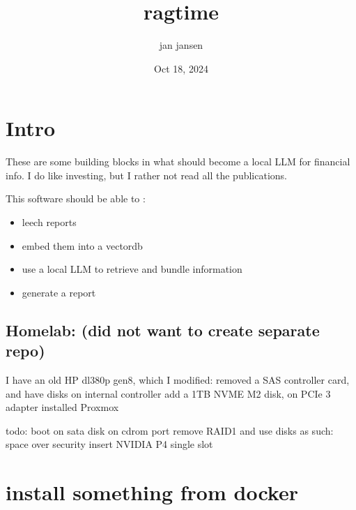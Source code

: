 \documentclass[letterpaper,10pt,english]{sphinxmanual}
\title{ragtime}
\date{Oct 18, 2024}
\author{jan jansen}
\begin{document}
\pagestyle{empty}
\sphinxmaketitle
\pagestyle{plain}
\sphinxtableofcontents
\pagestyle{normal}
\label{\detokenize{index::doc}}



\chapter{Intro}
\label{\detokenize{intro:intro}}\label{\detokenize{intro::doc}}
\sphinxAtStartPar
These are some building blocks in what should become a local LLM for financial info.
I do like investing, but I rather not read all the publications.

\sphinxAtStartPar
This software should be able to  :
\begin{itemize}
\item {} 
\sphinxAtStartPar
leech reports

\item {} 
\sphinxAtStartPar
embed them into a vectordb

\item {} 
\sphinxAtStartPar
use a local LLM to retrieve and bundle information

\item {} 
\sphinxAtStartPar
generate a report

\end{itemize}


\section{Homelab: (did not want to create separate repo)}
\label{\detokenize{intro:homelab-did-not-want-to-create-separate-repo}}
\sphinxAtStartPar
I have an old HP dl380p gen8, which I modified:
\sphinxhyphen{} removed a SAS controller card, and have disks on internal controller
\sphinxhyphen{} add a 1TB NVME M2 disk, on PCI\sphinxhyphen{}e 3 adapter
\sphinxhyphen{} installed Proxmox

\sphinxAtStartPar
todo:
\sphinxhyphen{} boot on sata disk on cdrom port
\sphinxhyphen{} remove RAID1 and use disks as such: space over security
\sphinxhyphen{} insert NVIDIA P4 single slot


\chapter{install something from docker}
\label{\detokenize{docker:install-something-from-docker}}\label{\detokenize{docker::doc}}\begin{quote}

\sphinxAtStartPar
{}
\end{quote}
\end{document}
